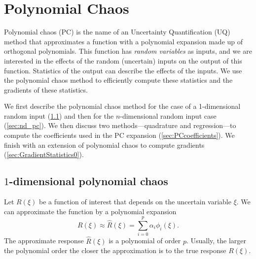 

\usepackage{braket}
\newcommand*{\E}{\mathrm{E}}  %
\newcommand*{\bxi}{\boldsymbol{\xi}}
\newcommand*{\bi}{\mathbf{i}}
\newcommand*{\bj}{\mathbf{j}}
\newcommand*{\balpha}{\boldsymbol{\alpha}}
\newcommand*{\bPhi}{\boldsymbol{\Phi}}
\newcommand*{\bx}{\mathbf{x}}
\newcommand*{\bX}{\mathbf{X}}
\newcommand*{\bI}{\mathbf{I}}



\chapter{Polynomial Chaos}

Polynomial chaos (PC) is the name of an Uncertainty Quantification (UQ) method that approximates a function with a polynomial expansion made up of orthogonal polynomials. This function has \textit{random variables} as inputs, and we are interested in the effects of the random (uncertain) inputs on the output of this function. Statistics of the output can describe the effects of the inputs. We use the polynomial chaos method to efficiently compute these statistics and the gradients of these statistics.

We first describe the polynomial chaos method for the case of a 1-dimensional random input (\cref{sec:1d_pc}) and then for the $n$-dimensional random input case (\cref{sec:nd_pc}). We then discuss two methods---quadrature and regression---to compute the coefficients used in the PC expansion (\cref{sec:PCcoefficients}). We finish with an extension of polynomial chaos to compute gradients (\cref{sec:GradientStatistics0}).

\section{$1$-dimensional polynomial chaos}
\label{sec:1d_pc}

Let $R(\xi)$ be a function of interest that depends on the uncertain variable $\xi$. We can approximate the function by a polynomial expansion
\begin{equation}
  R(\xi) \approx \hat{R}(\xi) = \sum_{i=0}^p \alpha_i \phi_i(\xi).
  \label{eq:OneD_expansion}
\end{equation}
The approximate response $\hat{R}(\xi)$ is a polynomial of order $p$. Usually, the larger the polynomial order the closer the approximation is to the true response $R(\xi)$.

